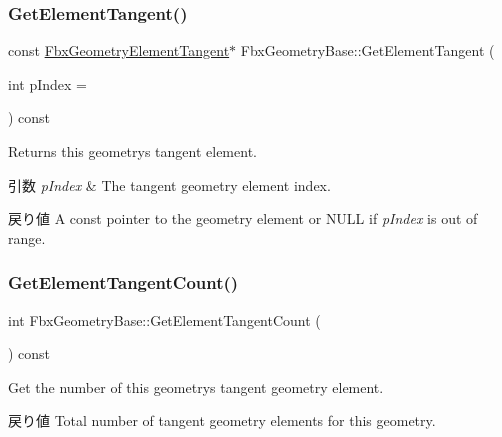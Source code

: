 \subsubsection{\texorpdfstring{Get\+Element\+Tangent()}{GetElementTangent()}\hspace{0.1cm}{\footnotesize\ttfamily [2/2]}}
{\footnotesize\ttfamily const \hyperlink{fbxlayer_8h_a291cacd8b247483cc24704c8f49087a7}{Fbx\+Geometry\+Element\+Tangent}$\ast$ Fbx\+Geometry\+Base\+::\+Get\+Element\+Tangent (\begin{DoxyParamCaption}\item[{int}]{p\+Index = {} }\end{DoxyParamCaption}) const}

Returns this geometry\textquotesingle{}s tangent element. 
\begin{DoxyParams}{引数}
{\em p\+Index} & The tangent geometry element index. \\
\hline
\end{DoxyParams}
\begin{DoxyReturn}{戻り値}
A const pointer to the geometry element or {\ttfamily N\+U\+LL} if {\itshape p\+Index} is out of range. 
\end{DoxyReturn}
\mbox{\label{class_fbx_geometry_base_ac7a775211507bd51dd804d8e013f625c}} 
\subsubsection{\texorpdfstring{Get\+Element\+Tangent\+Count()}{GetElementTangentCount()}}
{\footnotesize\ttfamily int Fbx\+Geometry\+Base\+::\+Get\+Element\+Tangent\+Count (\begin{DoxyParamCaption}{ }\end{DoxyParamCaption}) const}

Get the number of this geometry\textquotesingle{}s tangent geometry element. \begin{DoxyReturn}{戻り値}
Total number of tangent geometry elements for this geometry. 
\end{DoxyReturn}
\mbox{\label{class_fbx_geometry_base_aaae41fe6881f55fb722cb9fae88c5bbf}} 
